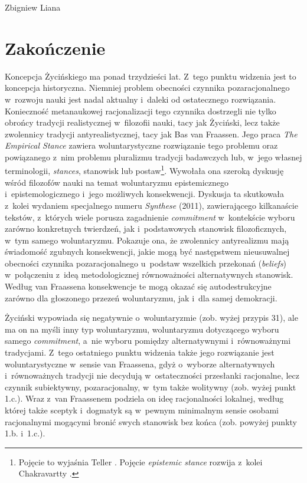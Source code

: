 \begin{artplenv}{Zbigniew Liana}
\section{Zakończenie}
Koncepcja Życińskiego ma ponad trzydzieści lat. Z~tego punktu widzenia jest to koncepcja historyczna. Niemniej problem obecności czynnika pozaracjonalnego w~rozwoju nauki jest nadal aktualny i~daleki od ostatecznego rozwiązania. Konieczność metanaukowej racjonalizacji tego czynnika dostrzegli nie tylko obrońcy tradycji realistycznej w~filozofii nauki, tacy jak Życiński, lecz także zwolennicy tradycji antyrealistycznej, tacy jak Bas van Fraassen. Jego praca \textit{The Empirical Stance}
\parencite*[][]{van_fraassen_empirical_2002} %
 zawiera woluntarystyczne rozwiązanie tego problemu oraz powiązanego z~nim problemu pluralizmu tradycji badawczych lub, w~jego własnej terminologii, \textit{stances}, stanowisk lub postaw\footnote{Pojęcie to wyjaśnia Teller 
\parencite*[][]{teller_discussion_2004}. %
 Pojęcie \textit{epistemic stance} rozwija z~kolei Chakravartty 
\parencite*[][]{chakravartty_puzzle_2011}.%
}. Wywołała ona szeroką dyskusję wśród filozofów nauki na temat woluntaryzmu epistemicznego i~epistemologicznego i~jego możliwych konsekwencji. Dyskusja ta skutkowała z~kolei wydaniem specjalnego numeru \textit{Synthese} (2011), zawierającego kilkanaście tekstów, z~których wiele porusza %
zagadnienie \textit{commitment} w~kontekście wyboru zarówno konkretnych twierdzeń, jak i~podstawowych stanowisk filozoficznych, w~tym samego woluntaryzmu. Pokazuje ona, że zwolennicy antyrealizmu mają świadomość zgubnych konsekwencji, jakie mogą być następstwem nieusuwalnej obecności czynnika pozaracjonalnego u~podstaw wszelkich przekonań (\textit{beliefs}) w~połączeniu z~ideą metodologicznej równoważności alternatywnych stanowisk. Według van Fraassena
\parencite*[][s.~158]{van_fraassen_stance_2011} %
 konsekwencje te mogą okazać się autodestrukcyjne zarówno dla głoszonego przezeń woluntaryzmu, jak i~dla samej demokracji.

Życiński wypowiada się negatywnie o~woluntaryzmie (zob. wyżej przypis 31), ale ma on na myśli inny typ woluntaryzmu, woluntaryzmu dotyczącego wyboru samego \textit{commitment}, a~nie wyboru pomiędzy alternatywnymi i~równoważnymi tradycjami. Z~tego ostatniego punktu widzenia także jego rozwiązanie jest woluntarystyczne w~sensie van Fraassena, gdyż o~wyborze alternatywnych i~równoważnych tradycji nie decydują w~ostateczności przesłanki racjonalne, lecz czynnik subiektywny, pozaracjonalny, w~tym także wolitywny (zob. wyżej punkt 1.c.). Wraz z~van Fraassenem podziela on ideę racjonalności lokalnej, według której także sceptyk i~dogmatyk są w~pewnym minimalnym sensie osobami racjonalnymi mogącymi bronić swych stanowisk bez końca (zob. powyżej punkty 1.b. i~1.c.).


\end{artplenv}
